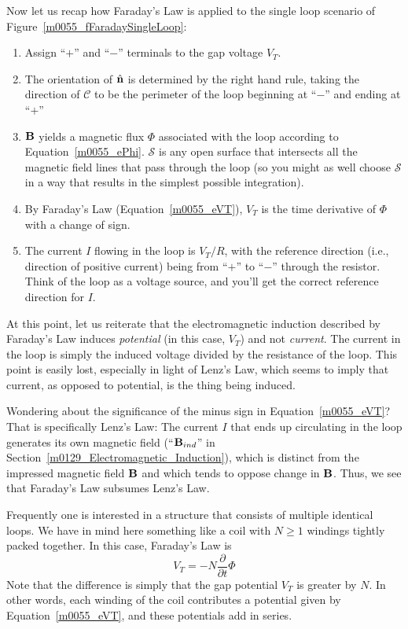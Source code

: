 Now let us recap how Faraday's Law is applied to the single loop scenario of Figure~\ref{m0055_fFaradaySingleLoop}:
%
\begin{enumerate}
\item Assign ``$+$'' and ``$-$'' terminals to the gap voltage $V_T$.
\item The orientation of $\hat{\bf n}$ is determined by the right hand rule, taking the direction of $\mathcal{C}$ to be the perimeter of the loop beginning at ``$-$'' and ending at ``$+$''
\item ${\bf B}$ yields a magnetic flux $\Phi$ associated with the loop according to Equation~\ref{m0055_ePhi}. $\mathcal{S}$ is any open surface that intersects all the magnetic field lines that pass through the loop (so you might as well choose $\mathcal{S}$ in a way that results in the simplest possible integration).
\item By Faraday's Law (Equation~\ref{m0055_eVT}), $V_T$ is the time derivative of $\Phi$ with a change of sign.
\item The current $I$ flowing in the loop is $V_T/R$, with the reference direction (i.e., direction of positive current) being from ``$+$'' to ``$-$'' through the resistor.  Think of the loop as a voltage source, and you'll get the correct reference direction for $I$.
\end{enumerate}

At this point, let us reiterate that the electromagnetic induction described by Faraday's Law induces \emph{potential} (in this case, $V_T$) and not \emph{current}.
The current in the loop is simply the induced voltage divided by the resistance of the loop.  
This point is easily lost, especially in light of Lenz's Law, which seems to imply that current, as opposed to potential, is the thing being induced.

Wondering about the significance of the minus sign in Equation~\ref{m0055_eVT}?  That is specifically Lenz's Law:  
The current $I$ that ends up circulating in the loop generates its own magnetic field (``${\bf B}_{ind}$'' in Section~\ref{m0129_Electromagnetic_Induction}), which is distinct from the impressed magnetic field ${\bf B}$ and which tends to oppose change in ${\bf B}$.  Thus, we see that Faraday's Law subsumes Lenz's Law.   

Frequently one is interested in a structure that consists of multiple identical loops.
We have in mind here something like a coil with $N\ge1$ windings tightly packed together.
In this case, Faraday's Law is 
%
\begin{equation}   
\boxed{
V_T = - N\frac{\partial}{\partial t} \Phi
}
\label{m0055_eVTN}
\end{equation}
%
Note that the difference is simply that the gap potential $V_T$  is greater by $N$.  
In other words, each winding of the coil contributes a potential given by Equation~\ref{m0055_eVT}, and these potentials add in series.

